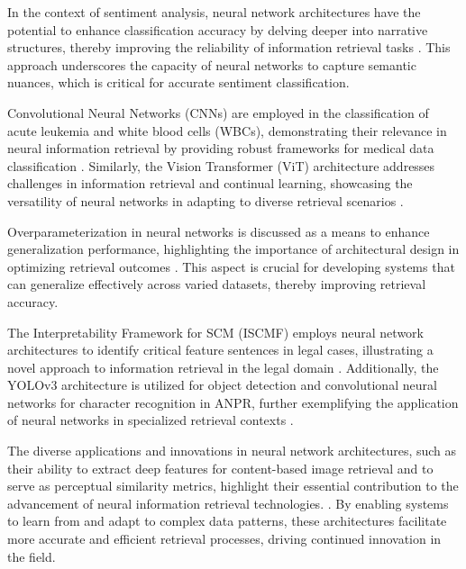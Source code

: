 In the context of sentiment analysis, neural network architectures have the potential to enhance classification accuracy by delving deeper into narrative structures, thereby improving the reliability of information retrieval tasks \cite{jannidis2016analyzingfeaturesdetectionhappy}. This approach underscores the capacity of neural networks to capture semantic nuances, which is critical for accurate sentiment classification.



Convolutional Neural Networks (CNNs) are employed in the classification of acute leukemia and white blood cells (WBCs), demonstrating their relevance in neural information retrieval by providing robust frameworks for medical data classification \cite{zolfaghari2023surveyautomateddetectionclassification}. Similarly, the Vision Transformer (ViT) architecture addresses challenges in information retrieval and continual learning, showcasing the versatility of neural networks in adapting to diverse retrieval scenarios \cite{chitale2023taskarithmeticloracontinual}.



Overparameterization in neural networks is discussed as a means to enhance generalization performance, highlighting the importance of architectural design in optimizing retrieval outcomes \cite{goldfarb2022analysiscatastrophicforgettingrandom}. This aspect is crucial for developing systems that can generalize effectively across varied datasets, thereby improving retrieval accuracy.



The Interpretability Framework for SCM (ISCMF) employs neural network architectures to identify critical feature sentences in legal cases, illustrating a novel approach to information retrieval in the legal domain \cite{lin2023interpretabilityframeworksimilarcase}. Additionally, the YOLOv3 architecture is utilized for object detection and convolutional neural networks for character recognition in ANPR, further exemplifying the application of neural networks in specialized retrieval contexts \cite{adak2022automaticnumberplaterecognition}.



The diverse applications and innovations in neural network architectures, such as their ability to extract deep features for content-based image retrieval and to serve as perceptual similarity metrics, highlight their essential contribution to the advancement of neural information retrieval technologies. \cite{pihlgren2024systematicperformanceanalysisdeep}. By enabling systems to learn from and adapt to complex data patterns, these architectures facilitate more accurate and efficient retrieval processes, driving continued innovation in the field.




